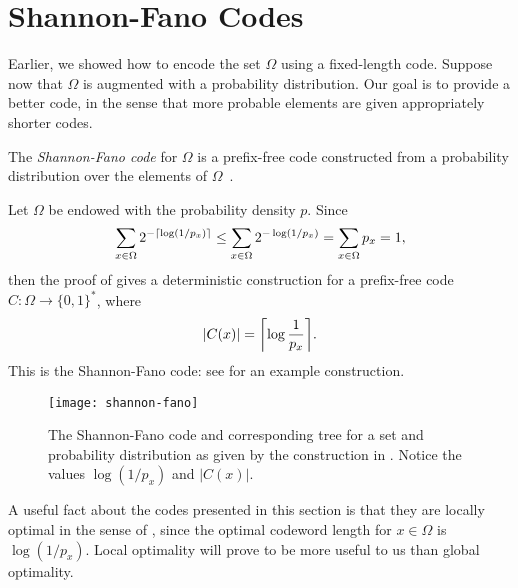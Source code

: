 \section{Shannon-Fano Codes}

Earlier, we showed how to encode the set $\Omega$ using a fixed-length
code. Suppose now that $\Omega$ is augmented with a probability
distribution. Our goal is to provide a better code, in the sense that
more probable elements are given appropriately shorter codes.

The \emph{Shannon-Fano code} for $\Omega$ is a prefix-free code
constructed from a probability distribution over the elements of
$\Omega$~\cite{fano:transmission, shannon:mathematical}.


Let $\Omega$ be endowed with the probability density $p$. Since
\[\sum_{x \in \Omega} 2^{-{\lceil \log (1/p_x) \rceil}} \leq \sum_{x \in \Omega} 2^{-\log
  (1/p_x)} = \sum_{x \in \Omega} p_x = 1,\]
then the proof of  gives a deterministic
construction for a prefix-free code $C : \Omega \to \{0, 1\}^*$, where
\[
|C(x)| = \Ceil{\log \frac{1}{p_x}}. \eqlabel{shannon-fano-optimality}
\]
This is the Shannon-Fano code: see  for an
example construction.

%
%
%

\begin{figure}
  \centering
  \texttt{[image: shannon-fano]}
  \caption{The Shannon-Fano code and corresponding tree for a set and
    probability distribution as given by the construction in
    . Notice the values $\log (1/p_x)$ and
    $|C(x)|$.}
\end{figure}

A useful fact about the codes presented in this section is that they
are locally optimal in the sense of , since
the optimal codeword length for $x \in \Omega$ is $\log (1/p_x)$.
Local optimality will prove to be more useful to us than global
optimality.

